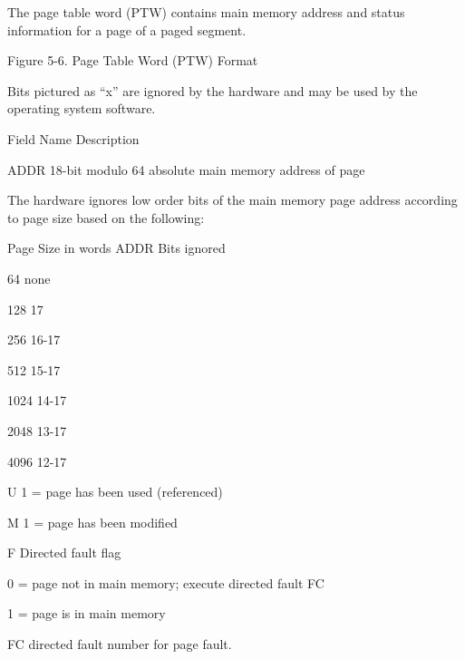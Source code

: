 The page table word (PTW) contains main memory address and status information
for a page of a paged segment.

Figure 5-6. Page Table Word (PTW) Format


Bits pictured as {``}x'' are ignored by the hardware and may be used by the
operating system software.

Field Name Description

ADDR 18-bit modulo 64 absolute main memory address of page


The hardware ignores low order bits of the main memory page address according
to page size based on the following:


Page Size in words ADDR Bits ignored

64 none

128 17

256 16-17

512 15-17

1024 14-17

2048 13-17

4096 12-17

U 1 = page has been used (referenced)

M 1 = page has been modified

F Directed fault flag

0 = page not in main memory; execute directed fault FC

1 = page is in main memory

FC directed fault number for page fault.





